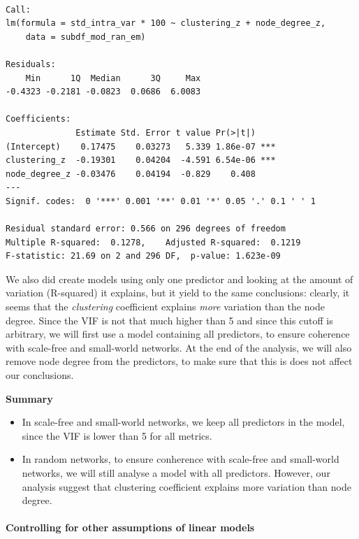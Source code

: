 \documentclass[
]{article}
\providecommand{\tightlist}{%
  \setlength{\itemsep}{0pt}\setlength{\parskip}{0pt}}
\begin{document}
\begin{verbatim}

Call:
lm(formula = std_intra_var * 100 ~ clustering_z + node_degree_z, 
    data = subdf_mod_ran_em)

Residuals:
    Min      1Q  Median      3Q     Max 
-0.4323 -0.2181 -0.0823  0.0686  6.0083 

Coefficients:
              Estimate Std. Error t value Pr(>|t|)    
(Intercept)    0.17475    0.03273   5.339 1.86e-07 ***
clustering_z  -0.19301    0.04204  -4.591 6.54e-06 ***
node_degree_z -0.03476    0.04194  -0.829    0.408    
---
Signif. codes:  0 '***' 0.001 '**' 0.01 '*' 0.05 '.' 0.1 ' ' 1

Residual standard error: 0.566 on 296 degrees of freedom
Multiple R-squared:  0.1278,    Adjusted R-squared:  0.1219 
F-statistic: 21.69 on 2 and 296 DF,  p-value: 1.623e-09
\end{verbatim}

We also did create models using only one predictor and looking at the
amount of variation (R-squared) it explains, but it yield to the same
conclusions: clearly, it seems that the \emph{clustering} coefficient
explains \emph{more} variation than the node degree. Since the VIF is
not that much higher than 5 and since this cutoff is arbitrary, we will
first use a model containing all predictors, to ensure coherence with
scale-free and small-world networks. At the end of the analysis, we will
also remove node degree from the predictors, to make sure that this is
does not affect our conclusions.

\textbf{Summary}

\begin{itemize}
\tightlist
\item
  In scale-free and small-world networks, we keep all predictors in the
  model, since the VIF is lower than 5 for all metrics.
\item
  In random networks, to ensure conherence with scale-free and
  small-world networks, we will still analyse a model with all
  predictors. However, our analysis suggest that clustering coefficient
  explains more variation than node degree.
\end{itemize}

\hypertarget{controlling-for-other-assumptions-of-linear-models}{%
\paragraph{Controlling for other assumptions of linear
models}\label{controlling-for-other-assumptions-of-linear-models}}
\end{document}
